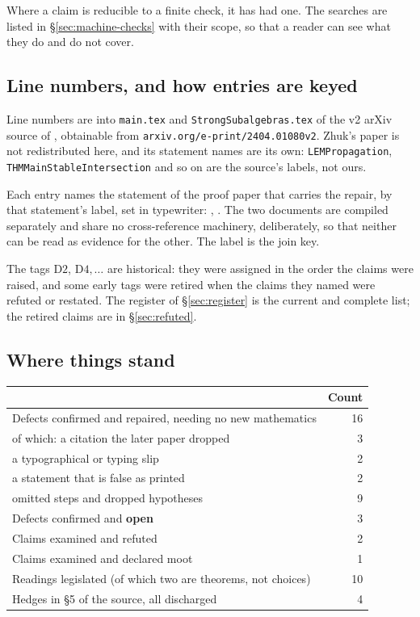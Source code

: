 Where a claim is reducible to a finite check, it has had one. The searches are
listed in \S\ref{sec:machine-checks} with their scope, so that a reader can see
what they do and do not cover.

\subsection{Line numbers, and how entries are keyed}\label{sec:keying}

Line numbers are into \texttt{main.tex} and \texttt{StrongSubalgebras.tex} of
the v2 arXiv source of \cite{ZhukSimplified}, obtainable from
\texttt{arxiv.org/e-print/2404.01080v2}. Zhuk's paper is not redistributed
here, and its statement names are its own: \texttt{LEMPropagation},
\texttt{THMMainStableIntersection} and so on are the source's labels, not ours.

Each entry names the statement of the proof paper that carries the repair, by
that statement's label, set in typewriter: ,
. The two documents are compiled separately and
share no cross-reference machinery, deliberately, so that neither can be read
as evidence for the other. The label is the join key.

The tags $\mathrm D2$, $\mathrm D4,\dots$ are historical: they were assigned in
the order the claims were raised, and some early tags were retired when the
claims they named were refuted or restated. The register of
\S\ref{sec:register} is the current and complete list; the retired claims are
in \S\ref{sec:refuted}.

\subsection{Where things stand}\label{sec:audit-tally}

\begin{center}\small
\begin{tabular}{@{}p{}r@{}}
\hline
\textbf{} & \textbf{Count} \\
\hline
Defects confirmed and repaired, needing no new mathematics & 16 \\
\quad of which: a citation the later paper dropped & 3 \\
\quad a typographical or typing slip & 2 \\
\quad a statement that is false as printed & 2 \\
\quad omitted steps and dropped hypotheses & 9 \\
Defects confirmed and \textbf{open} & 3 \\
Claims examined and refuted & 2 \\
Claims examined and declared moot & 1 \\
Readings legislated (of which two are theorems, not choices) & 10 \\
Hedges in \S5 of the source, all discharged & 4 \\
\hline
\end{tabular}
\end{center}

